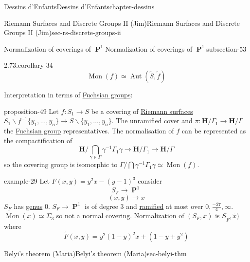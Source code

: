 \documentclass[oneside,10pt,]{book}
\numberwithin{equation}{section}
\newcommand{\inv}{^{-1}}
\newcommand{\HH}{\mathbf{H}}
\DeclareMathOperator{\PP}{\mathbf{P}}
\DeclareMathOperator{\Aut}{Aut}
\begin{document}
\begin{chapterptx}{Dessins d'Enfants}{}{Dessins d'Enfants}{}{}{chapter-dessins}
\begin{sectionptx}{Riemann Surfaces and Discrete Groups II (Jim)}{}{Riemann Surfaces and Discrete Groups II (Jim)}{}{}{sec-rs-discrete-groups-ii}
\begin{subsectionptx}{Normalization of coverings of \(\PP^1\)}{}{Normalization of coverings of \(\PP^1\)}{}{}{subsection-53}
\begin{corollary}{2.73.}{}{corollary-34}
\hypertarget{p-593}{}%
%
\begin{equation*}
\operatorname{Mon}(f)  \simeq \Aut(\tilde S, \tilde f)
\end{equation*}
%
\end{corollary}
\hypertarget{p-594}{}%
Interpretation in terms of \hyperref[def-fuchsian-group]{Fuchsian groups}:%
\begin{proposition}{}{}{proposition-49}%
\hypertarget{p-595}{}%
Let \(f\colon S_1 \to S\) be a covering of \hyperref[def-top-riem-surface]{Riemann surfaces} \(S_1\smallsetminus f\inv \{ y_1, \ldots, y_n \} \to S \smallsetminus\{ y_1, \ldots, y_n \}\). The unramified cover and \(\pi \colon \HH/ \Gamma_1 \to \HH/ \Gamma\) the \hyperref[def-fuchsian-group]{Fuchsian group} representatives. The normalisation of \(f\) can be represented as the compactification of%
\begin{equation*}
\HH/ \bigcap_{\gamma \in \Gamma} \gamma \inv \Gamma_1 \gamma \to \HH/\Gamma_1 \to \HH/\Gamma
\end{equation*}
so the covering group is isomorphic to \(\Gamma/ \bigcap \gamma \inv \Gamma_1 \gamma \simeq \operatorname{Mon}(f)\).%
\end{proposition}
\begin{example}{}{example-29}%
\hypertarget{p-596}{}%
Let \(F(x,y) = y^2x - (y-1)^3\) consider%
\begin{equation*}
S_F \to \PP^1
\end{equation*}
%
\begin{equation*}
(x,y) \to x
\end{equation*}
\(S_F\) has \hyperref[def-class-set]{genus} 0. \(S_F \to \PP^1\) is of degree 3 and \hyperref[def-dess-ramified]{ramified} at most over \(0, \frac{-27}{4}, \infty\). \(\operatorname{Mon}(x)  \simeq \Sigma_3\) so not a normal covering. Normalization of \((S_F, x)\) is \(S_{\tilde F} , \tilde x)\) where%
\begin{equation*}
\tilde F (x,y) = y^2 ( 1-y)^2 x +  (1-y + y^2)
\end{equation*}
%
\end{example}
\end{subsectionptx}
\end{sectionptx}
%
%
\typeout{************************************************}
\typeout{************************************************}
%
\begin{sectionptx}{Belyi's theorem (Maria)}{}{Belyi's theorem (Maria)}{}{}{sec-belyi-thm}
\begin{introduction}{}%

\end{introduction}
\end{sectionptx}
\end{chapterptx}
\end{document}
